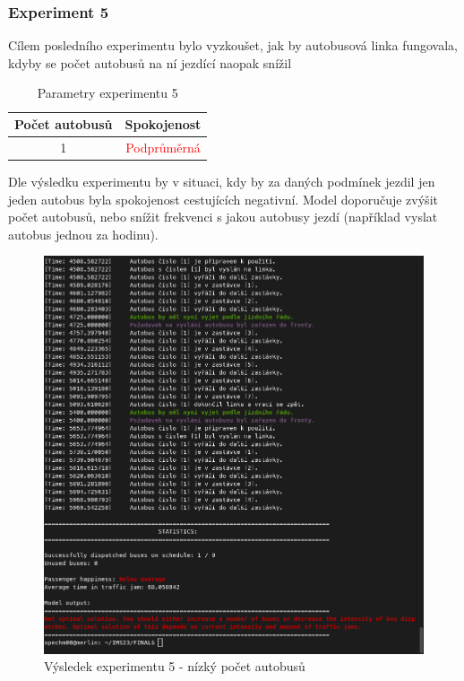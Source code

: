\documentclass[a4paper]{article}
\begin{document}
            \newpage
            \subsubsection{Experiment 5}
            \label{subsubsec:experiment5}

                Cílem posledního experimentu bylo vyzkoušet, jak by autobusová linka fungovala, kdyby se počet autobusů na ní jezdící naopak snížil
    
                \begin{table}[H]
                    \centering
                    \begin{tabular}{ | c | c |}
                        \hline
                        Počet autobusů & Spokojenost\\
                        \hline
                        \hline
                        1 & \textcolor{red}{Podprůměrná} \\
                        \hline
                    \end{tabular}
                    \caption{Parametry experimentu 5}
                    \label{tab:experiment5}
                \end{table}

            Dle výsledku experimentu by v situaci, kdy by za daných podmínek jezdil jen jeden autobus byla spokojenost cestujících negativní. Model doporučuje zvýšit počet autobusů, nebo snížit frekvenci s jakou autobusy jezdí (například vyslat autobus jednou za hodinu).
                
                \begin{figure}[H]
                \includegraphics[scale=0.37, keepaspectratio]{fig/ims_bus5.png}
                \caption{Výsledek experimentu 5 - nízký počet autobusů}
                \label{fig:experiment5}
            \end{figure}
\end{document}
